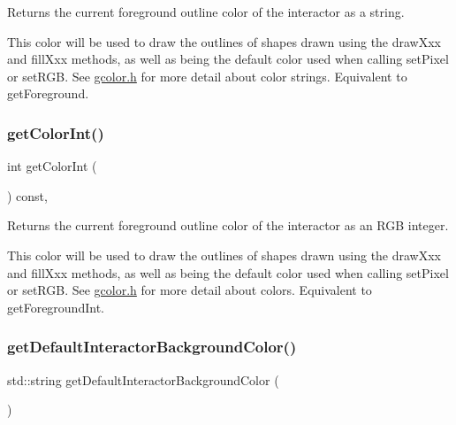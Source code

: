Returns the current foreground outline color of the interactor as a string. 

This color will be used to draw the outlines of shapes drawn using the draw\+Xxx and fill\+Xxx methods, as well as being the default color used when calling set\+Pixel or set\+R\+GB. See \mbox{\hyperlink{gcolor_8h_source}{gcolor.\+h}} for more detail about color strings. Equivalent to get\+Foreground. \mbox{\label{classsgl_1_1GDrawingSurface_a9635c7af766cdc3417f346683fa0e6c1}} 
\subsubsection{\texorpdfstring{get\+Color\+Int()}{getColorInt()}}
{\footnotesize\ttfamily int get\+Color\+Int (\begin{DoxyParamCaption}{ }\end{DoxyParamCaption}) const\hspace{0.3cm}{\ttfamily [virtual]}, {\ttfamily [inherited]}}



Returns the current foreground outline color of the interactor as an R\+GB integer. 

This color will be used to draw the outlines of shapes drawn using the draw\+Xxx and fill\+Xxx methods, as well as being the default color used when calling set\+Pixel or set\+R\+GB. See \mbox{\hyperlink{gcolor_8h_source}{gcolor.\+h}} for more detail about colors. Equivalent to get\+Foreground\+Int. \mbox{\label{classsgl_1_1GWindow_a43cda7f9c8a6eb4ff1519fb99a3c2901}} 
\subsubsection{\texorpdfstring{get\+Default\+Interactor\+Background\+Color()}{getDefaultInteractorBackgroundColor()}}
{\footnotesize\ttfamily std\+::string get\+Default\+Interactor\+Background\+Color (\begin{DoxyParamCaption}{ }\end{DoxyParamCaption})\hspace{0.3cm}{\ttfamily [static]}}



